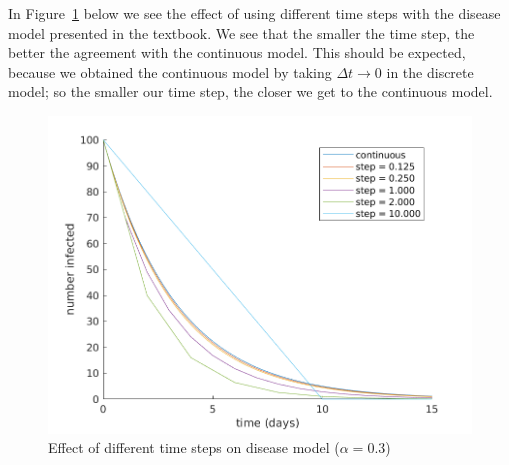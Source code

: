 \documentclass{article}
\begin{document}
In Figure~\ref{fig:142} below we see the effect of using different time
steps with the disease model presented in the textbook. We see that the
smaller the time step, the better the agreement with the continuous
model. This should be expected, because we obtained the continuous model
by taking $\Delta t \to 0$ in the discrete model; so the smaller our time
step, the closer we get to the continuous model.
%
\begin{figure}[ht]
    \includegraphics[width=35em]{q142}
    \centering
    \caption{Effect of different time steps on disease model ($\alpha = 0.3$)}
    \label{fig:142}
\end{figure}
\end{document}
